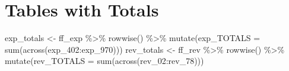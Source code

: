 \documentclass[
  letterpaper,
  DIV=11,
  numbers=noendperiod]{scrreport}
\newenvironment{Shaded}{\begin{snugshade}}{\end{snugshade}}
\newcommand{\AttributeTok}[1]{\textcolor[rgb]{0.40,0.45,0.13}{#1}}
\newcommand{\FunctionTok}[1]{\textcolor[rgb]{0.28,0.35,0.67}{#1}}
\newcommand{\NormalTok}[1]{\textcolor[rgb]{0.00,0.23,0.31}{#1}}
\newcommand{\OtherTok}[1]{\textcolor[rgb]{0.00,0.23,0.31}{#1}}
\newcommand{\SpecialCharTok}[1]{\textcolor[rgb]{0.37,0.37,0.37}{#1}}
\begin{document}
\hypertarget{tables-with-totals}{%
\section{Tables with Totals}\label{tables-with-totals}}

\begin{Shaded}
\begin{Highlighting}[]
\NormalTok{exp\_totals }\OtherTok{\textless{}{-}}\NormalTok{ ff\_exp }\SpecialCharTok{\%\textgreater{}\%} \FunctionTok{rowwise}\NormalTok{() }\SpecialCharTok{\%\textgreater{}\%} \FunctionTok{mutate}\NormalTok{(}\AttributeTok{exp\_TOTALS =} \FunctionTok{sum}\NormalTok{(}\FunctionTok{across}\NormalTok{(exp\_402}\SpecialCharTok{:}\NormalTok{exp\_970)))}
\NormalTok{rev\_totals }\OtherTok{\textless{}{-}}\NormalTok{ ff\_rev }\SpecialCharTok{\%\textgreater{}\%}    \FunctionTok{rowwise}\NormalTok{() }\SpecialCharTok{\%\textgreater{}\%} 
  \FunctionTok{mutate}\NormalTok{(}\AttributeTok{rev\_TOTALS =} \FunctionTok{sum}\NormalTok{(}\FunctionTok{across}\NormalTok{(rev\_02}\SpecialCharTok{:}\NormalTok{rev\_78)))}


\end{Highlighting}
\end{Shaded}
\end{document}
